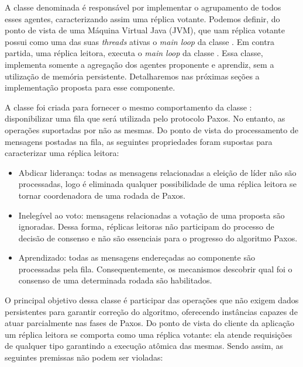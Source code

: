 A classe denominada  é responsável por implementar o
agrupamento de todos esses agentes, caracterizando assim uma réplica votante. Podemos
definir, do ponto de vista de uma Máquina Virtual Java (JVM), que uam réplica votante
possui como uma das suas \emph{threads} ativas o \emph{main loop} da classe
. Em contra partida, uma réplica leitora, executa o
\emph{main loop} da classe . Essa classe, implementa somente
a agregação dos agentes proponente e aprendiz, sem a utilização de memória persistente.
Detalharemos nas próximas seções a implementação proposta para esse componente.


A classe  foi criada para fornecer o mesmo comportamento da
classe : disponibilizar uma fila que será utilizada pelo
protocolo Paxos. No entanto, as operações suportadas por 
não as mesmas. Do ponto de vista do processamento de mensagens postadas na fila, as
seguintes propriedades foram supostas para caracterizar uma réplica leitora:

\begin{itemize}
  \item Abdicar liderança: todas as mensagens relacionadas a eleição de líder não são
    processadas, logo é eliminada qualquer possibilidade de uma réplica leitora se tornar
    coordenadora de uma rodada de Paxos.
  \item Inelegível ao voto: mensagens relacionadas a votação de uma proposta são
    ignoradas. Dessa forma, réplicas leitoras não participam do processo de decisão de
    consenso e não são essenciais para o progresso do algoritmo Paxos.
  \item Aprendizado: todas as mensagens endereçadas ao componente  são
    processadas pela fila. Consequentemente, os mecanismos descobrir qual foi o consenso
    de uma determinada rodada são habilitados.
\end{itemize}

O principal objetivo dessa classe é participar das operações que não exigem dados
persistentes para garantir correção do algoritmo, oferecendo instâncias capazes de atuar
parcialmente nas fases de Paxos. Do ponto de vista do cliente da aplicação um réplica
leitora se comporta como uma réplica votante: ela atende requisições de qualquer tipo
garantindo a execução atômica das mesmas. Sendo assim, as seguintes premissas não podem
ser violadas:

